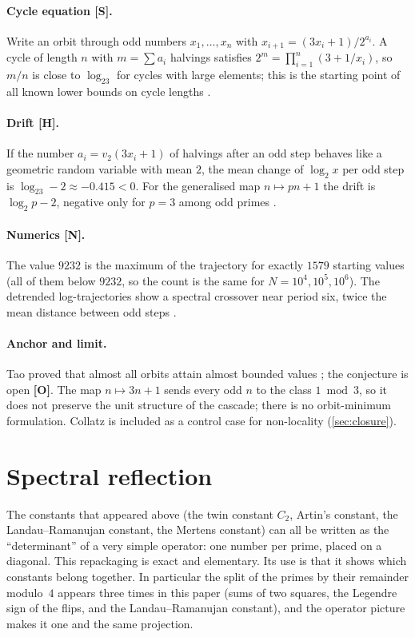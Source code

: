 \documentclass[11pt,a4paper]{article}
\newcommand{\statS}{\textsf{\textbf{[S]}}}
\newcommand{\statN}{\textsf{\textbf{[N]}}}
\newcommand{\statO}{\textsf{\textbf{[O]}}}
\newcommand{\statH}{\textsf{\textbf{[H]}}}
\theoremstyle{plain}
\theoremstyle{definition}
\theoremstyle{remark}
\begin{document}
\paragraph{Cycle equation \statS.} Write an orbit through odd numbers
$x_1,\dots,x_n$ with $x_{i+1}=(3x_i+1)/2^{a_i}$. A cycle of length $n$ with
$m=\sum a_i$ halvings satisfies
$2^m=\prod_{i=1}^n(3+1/x_i)$, so $m/n$ is close to $\log_23$ for cycles with
large elements; this is the starting point of all known lower bounds on
cycle lengths \cite{Lagarias}.

\paragraph{Drift \statH.} If the number $a_i=v_2(3x_i+1)$ of halvings after
an odd step behaves like a geometric random variable with mean $2$, the mean
change of $\log_2x$ per odd step is $\log_23-2\approx-0.415<0$. For the
generalised map $n\mapsto pn+1$ the drift is $\log_2p-2$, negative only for
$p=3$ among odd primes \cite{K-collatz}.

\paragraph{Numerics \statN.} The value $9232$ is the maximum of the trajectory
for exactly $1579$ starting values (all of them below $9232$, so the count is
the same for $N=10^4,10^5,10^6$). The detrended log-trajectories show a
spectral crossover near period six, twice the mean distance between odd steps
\cite{K-collatz}.

\paragraph{Anchor and limit.} Tao proved that almost all orbits attain almost
bounded values \cite{Tao}; the conjecture is open \statO. The map
$n\mapsto3n+1$ sends every odd $n$ to the class $1\bmod3$, so it does not
preserve the unit structure of the cascade; there is no orbit-minimum
formulation. Collatz is included as a control case for non-locality
(\cref{sec:closure}).

\section{Spectral reflection}\label{sec:spectral}

\begin{plainwords}
The constants that appeared above (the twin constant $C_2$, Artin's constant,
the Landau--Ramanujan constant, the Mertens constant) can all be written as
the ``determinant'' of a very simple operator: one number per prime, placed on
a diagonal. This repackaging is exact and elementary. Its use is that it
shows which constants belong together. In particular the split of the primes
by their remainder modulo~$4$ appears three times in this paper (sums of two
squares, the Legendre sign of the flips, and the Landau--Ramanujan constant),
and the operator picture makes it one and the same projection.
\end{plainwords}
\end{document}
